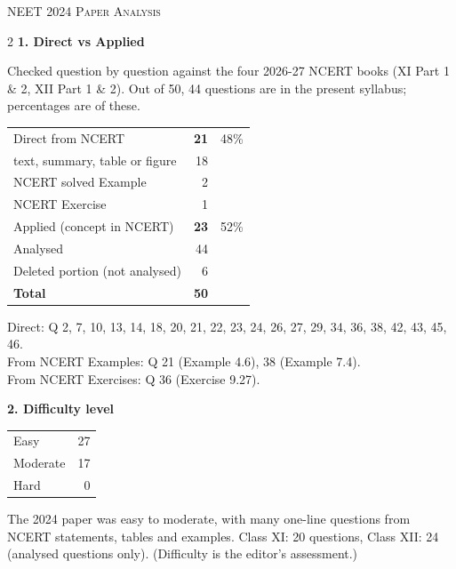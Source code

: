 \clearpage
\begin{center}{}\par
{\fontsize{20}{24}\selectfont\color{navy}\scshape NEET 2024 \textperiodcentered{} Paper Analysis}\par
{\color{gilt}}\end{center}
\vspace{4pt}
\begin{multicols}{2}
\textbf{\color{crimson}1. Direct vs Applied}\par\smallskip
{\footnotesize Checked question by question against the four 2026-27 NCERT books (XI Part 1 \& 2, XII Part 1 \& 2). Out of 50, 44 questions are in the present syllabus; percentages are of these.}\par\smallskip
\begin{tabular}{@{}lrr@{}}\toprule
Direct from NCERT & \textbf{21} & 48\%\\
\quad text, summary, table or figure & 18 &\\
\quad NCERT solved Example & 2 &\\
\quad NCERT Exercise & 1 &\\
Applied (concept in NCERT) & \textbf{23} & 52\%\\\midrule
Analysed & 44 &\\
Deleted portion (not analysed) & 6 &\\\midrule
\textbf{Total} & \textbf{50} &\\\bottomrule\end{tabular}\par\smallskip
{\footnotesize Direct: Q 2, 7, 10, 13, 14, 18, 20, 21, 22, 23, 24, 26, 27, 29, 34, 36, 38, 42, 43, 45, 46.\\ From NCERT Examples: Q 21 (Example 4.6), 38 (Example 7.4).\\ From NCERT Exercises: Q 36 (Exercise 9.27).}\par\medskip
\textbf{\color{crimson}2. Difficulty level}\par\smallskip
\begin{tabular}{@{}lr@{}}\toprule
Easy & 27\\ Moderate & 17\\ Hard & 0\\\bottomrule\end{tabular}\par\smallskip
{\footnotesize The 2024 paper was easy to moderate, with many one-line questions from NCERT statements, tables and examples. Class XI: 20 questions, Class XII: 24 (analysed questions only). (Difficulty is the editor's assessment.)}\par\medskip

\end{multicols}
